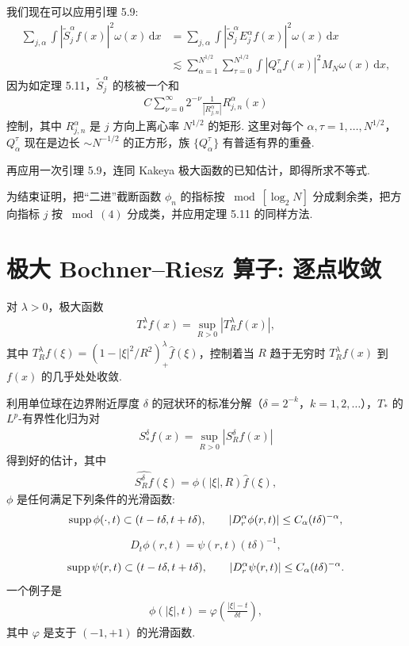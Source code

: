 我们现在可以应用引理 5.9:
\begin{align*}
  \sum_{j,\alpha}\int\left|\widetilde{S}_{j}^{\alpha}f(x)\right|^{2}\omega(x)\,\mathrm{d}x
  &=\sum_{j,\alpha}\int\left|\widetilde{S}_{j}^{\alpha}E_{j}^{\alpha}f(x)\right|^{2}\omega(x)\,\mathrm{d}x\\
  &\lesssim\sum_{\alpha=1}^{N^{1/2}}\sum_{\tau=0}^{N^{1/2}}\int|Q_{\alpha}^{\tau}f(x)|^{2}M_{N}\omega(x)\,\mathrm{d}x,
\end{align*}
因为如定理 5.11，$\widetilde{S}_{j}^{\alpha}$ 的核被一个和
\begin{align*}
  C\sum_{\nu=0}^{\infty}2^{-\nu}\frac{1}{|R_{j,n}^{\alpha}|}R_{j,n}^{\alpha}(x)
\end{align*}
控制，其中 $R_{j,n}^{\alpha}$ 是 $j$ 方向上离心率 $N^{1/2}$ 的矩形. 这里对每个 $\alpha, \tau = 1, \ldots, N^{1/2}$，$Q_{\alpha}^{\tau}$ 现在是边长 $\sim N^{-1/2}$ 的正方形，族 $\{Q_{\alpha}^{\tau}\}$ 有普适有界的重叠.

再应用一次引理 5.9，连同 Kakeya 极大函数的已知估计，即得所求不等式.

为结束证明，把``二进''截断函数 $\phi_n$ 的指标按 $\bmod[\log_2 N]$ 分成剩余类，把方向指标 $j$ 按 $\bmod(4)$ 分成类，并应用定理 5.11 的同样方法.

\section{极大 Bochner--Riesz 算子: 逐点收敛}

对 $\lambda > 0$，极大函数
\begin{align*}
  T_{*}^{\lambda}f(x)=\sup_{R>0}|T_{R}^{\lambda}f(x)|,
\end{align*}
其中 $T_{R}^{\lambda}f(\xi)=(1-|\xi|^{2}/R^{2})_{+}^{\lambda}\widehat{f}(\xi)$，控制着当 $R$ 趋于无穷时 $T_{R}^{\lambda}f(x)$ 到 $f(x)$ 的几乎处处收敛.

利用单位球在边界附近厚度 $\delta$ 的冠状环的标准分解（$\delta = 2^{-k}$，$k = 1, 2, \ldots$），$T_*$ 的 $L^p$-有界性化归为对
\begin{align*}
  S_{*}^{\delta}f(x)=\sup_{R>0}|S_{R}^{\delta}f(x)|
\end{align*}
得到好的估计，其中
\begin{align*}
  \widehat{S_{R}^{\delta}f}(\xi)=\phi(|\xi|,R)\widehat{f}(\xi),
\end{align*}
$\phi$ 是任何满足下列条件的光滑函数:
\begin{align*}
  \operatorname{supp}\phi(\cdot,t)\subset(t-t\delta,t+t\delta),\qquad
  |D_{r}^{\alpha}\phi(r,t)|\leq C_{\alpha}(t\delta)^{-\alpha},
\end{align*}
\begin{align*}
  D_{t}\phi(r,t)=\psi(r,t)(t\delta)^{-1},
\end{align*}
\begin{align*}
  \operatorname{supp}\psi(r,t)\subset(t-t\delta,t+t\delta),\qquad
  |D_{r}^{\alpha}\psi(r,t)|\leq C_{\alpha}(t\delta)^{-\alpha}.
\end{align*}
一个例子是
\begin{align*}
  \phi(|\xi|,t)=\varphi\left(\frac{|\xi|-t}{\delta t}\right),
\end{align*}
其中 $\varphi$ 是支于 $(-1,+1)$ 的光滑函数.

